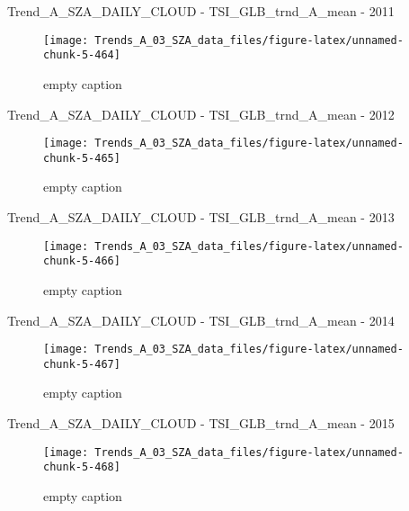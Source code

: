 \documentclass[
  10pt,
  a4paper,oneside]{article}
\begin{document}
Trend\_A\_SZA\_DAILY\_CLOUD - TSI\_GLB\_trnd\_A\_mean - 2011

\begin{figure}[!ht]

{\centering \texttt{[image: Trends\_A\_03\_SZA\_data\_files/figure-latex/unnamed-chunk-5-464]} 

}

\caption{ empty caption }\label{fig:unnamed-chunk-5-464}
\end{figure}

Trend\_A\_SZA\_DAILY\_CLOUD - TSI\_GLB\_trnd\_A\_mean - 2012

\begin{figure}[!ht]

{\centering \texttt{[image: Trends\_A\_03\_SZA\_data\_files/figure-latex/unnamed-chunk-5-465]} 

}

\caption{ empty caption }\label{fig:unnamed-chunk-5-465}
\end{figure}

Trend\_A\_SZA\_DAILY\_CLOUD - TSI\_GLB\_trnd\_A\_mean - 2013

\begin{figure}[!ht]

{\centering \texttt{[image: Trends\_A\_03\_SZA\_data\_files/figure-latex/unnamed-chunk-5-466]} 

}

\caption{ empty caption }\label{fig:unnamed-chunk-5-466}
\end{figure}

Trend\_A\_SZA\_DAILY\_CLOUD - TSI\_GLB\_trnd\_A\_mean - 2014

\begin{figure}[!ht]

{\centering \texttt{[image: Trends\_A\_03\_SZA\_data\_files/figure-latex/unnamed-chunk-5-467]} 

}

\caption{ empty caption }\label{fig:unnamed-chunk-5-467}
\end{figure}

Trend\_A\_SZA\_DAILY\_CLOUD - TSI\_GLB\_trnd\_A\_mean - 2015

\begin{figure}[!ht]

{\centering \texttt{[image: Trends\_A\_03\_SZA\_data\_files/figure-latex/unnamed-chunk-5-468]} 

}

\caption{ empty caption }\label{fig:unnamed-chunk-5-468}
\end{figure}
\end{document}
